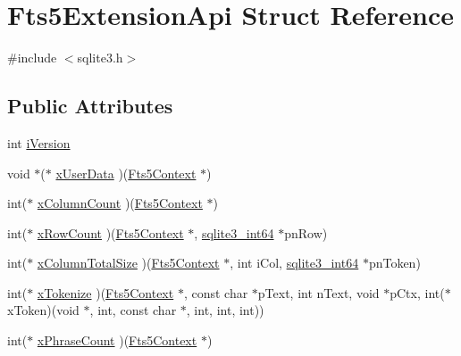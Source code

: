 \hypertarget{struct_fts5_extension_api}{}\section{Fts5\+Extension\+Api Struct Reference}
\label{struct_fts5_extension_api}


{\ttfamily \#include $<$sqlite3.\+h$>$}

\subsection*{Public Attributes}
\begin{DoxyCompactItemize}
\item 
int \mbox{\hyperlink{struct_fts5_extension_api_af9c8f09c2e6f1373e6bce57ec9861682}{i\+Version}}
\item 
void $\ast$($\ast$ \mbox{\hyperlink{struct_fts5_extension_api_a8e651288d8e0cf25f20f2b838f47ac34}{x\+User\+Data}} )(\mbox{\hyperlink{sqlite3_8h_a97821b95ebebd43db901977ffd5b26bc}{Fts5\+Context}} $\ast$)
\item 
int($\ast$ \mbox{\hyperlink{struct_fts5_extension_api_a427409c50da4e179c8f2d36b22a4ba21}{x\+Column\+Count}} )(\mbox{\hyperlink{sqlite3_8h_a97821b95ebebd43db901977ffd5b26bc}{Fts5\+Context}} $\ast$)
\item 
int($\ast$ \mbox{\hyperlink{struct_fts5_extension_api_ae1eb7ad1d3c131a09376134ecc099568}{x\+Row\+Count}} )(\mbox{\hyperlink{sqlite3_8h_a97821b95ebebd43db901977ffd5b26bc}{Fts5\+Context}} $\ast$, \mbox{\hyperlink{sqlite3_8h_a0a4d3e6c1ad46f90e746b920ab6ca0d2}{sqlite3\+\_\+int64}} $\ast$pn\+Row)
\item 
int($\ast$ \mbox{\hyperlink{struct_fts5_extension_api_a096e79406ae03df9796a2082d0ac8269}{x\+Column\+Total\+Size}} )(\mbox{\hyperlink{sqlite3_8h_a97821b95ebebd43db901977ffd5b26bc}{Fts5\+Context}} $\ast$, int i\+Col, \mbox{\hyperlink{sqlite3_8h_a0a4d3e6c1ad46f90e746b920ab6ca0d2}{sqlite3\+\_\+int64}} $\ast$pn\+Token)
\item 
int($\ast$ \mbox{\hyperlink{struct_fts5_extension_api_a670af0d7715f69834376f8df187dcf30}{x\+Tokenize}} )(\mbox{\hyperlink{sqlite3_8h_a97821b95ebebd43db901977ffd5b26bc}{Fts5\+Context}} $\ast$, const char $\ast$p\+Text, int n\+Text, void $\ast$p\+Ctx, int($\ast$x\+Token)(void $\ast$, int, const char $\ast$, int, int, int))
\item 
int($\ast$ \mbox{\hyperlink{struct_fts5_extension_api_a3ba0207080a9ca498625eefcc120bf1e}{x\+Phrase\+Count}} )(\mbox{\hyperlink{sqlite3_8h_a97821b95ebebd43db901977ffd5b26bc}{Fts5\+Context}} $\ast$)

\end{DoxyCompactItemize}
